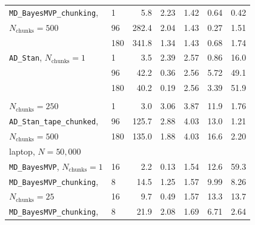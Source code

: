 \begin{table}[H]
{\begin{tabular}{llrrrrr}
\texttt{MD\_BayesMVP\_chunking}, & 1 & 5.8 & 2.23 & 1.42 & 0.64 & 0.42 \\
$N_{\text{chunks}} = 500$ & 96 & 282.4 & 2.04 & 1.43 & 0.27 & 1.51 \\
 & 180 & 341.8 & 1.34 & 1.43 & 0.68 & 1.74 \\
\texttt{AD\_Stan}, $N_{\text{chunks}} = 1$ & 1 & 3.5 & 2.39 & 2.57 & 0.86 & 16.0 \\
 & 96 & 42.2 & 0.36 & 2.56 & 5.72 & 49.1 \\
 & 180 & 40.2 & 0.19 & 2.56 & 3.39 & 51.9 \\
\makecell[tl]{\texttt{AD\_Stan\_tape\_chunked}, \\ $N_{\text{chunks}} = 250$} & 1 & 3.0 & 3.06 & 3.87 & 11.9 & 1.76 \\
\texttt{AD\_Stan\_tape\_chunked}, & 96 & 125.7 & 2.88 & 4.03 & 13.0 & 1.21 \\
$N_{\text{chunks}} = 500$ & 180 & 135.0 & 1.88 & 4.03 & 16.6 & 2.20 \\
\multicolumn{7}{l}{laptop, $N{=}50,000$} \\
\texttt{MD\_BayesMVP}, $N_{\text{chunks}} = 1$ & 16 & 2.2 & 0.13 & 1.54 & 12.6 & 59.3 \\
\texttt{MD\_BayesMVP\_chunking}, & 8 & 14.5 & 1.25 & 1.57 & 9.99 & 8.26 \\
$N_{\text{chunks}} = 25$ & 16 & 9.7 & 0.49 & 1.57 & 13.3 & 13.7 \\
\texttt{MD\_BayesMVP\_chunking}, & 8 & 21.9 & 2.08 & 1.69 & 6.71 & 2.64 \\

\end{tabular}}
\end{table}
